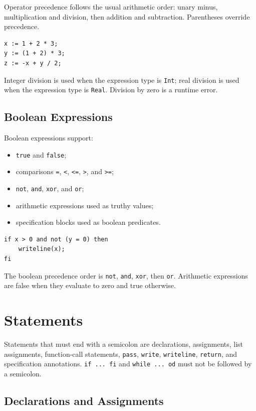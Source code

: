 \documentclass[11pt]{article}
\begin{document}
Operator precedence follows the usual arithmetic order: unary minus, multiplication and division, then addition and subtraction. Parentheses override precedence.

\begin{lstlisting}
x := 1 + 2 * 3;
y := (1 + 2) * 3;
z := -x + y / 2;
\end{lstlisting}

Integer division is used when the expression type is \texttt{Int}; real division is used when the expression type is \texttt{Real}. Division by zero is a runtime error.

\subsection{Boolean Expressions}

Boolean expressions support:

\begin{itemize}[nosep]
  \item \texttt{true} and \texttt{false};
  \item comparisons \texttt{=}, \texttt{<}, \texttt{<=}, \texttt{>}, and \texttt{>=};
  \item \texttt{not}, \texttt{and}, \texttt{xor}, and \texttt{or};
  \item arithmetic expressions used as truthy values;
  \item specification blocks used as boolean predicates.
\end{itemize}

\begin{lstlisting}
if x > 0 and not (y = 0) then
    writeline(x);
fi
\end{lstlisting}

The boolean precedence order is \texttt{not}, \texttt{and}, \texttt{xor}, then \texttt{or}. Arithmetic expressions are false when they evaluate to zero and true otherwise.

\section{Statements}

Statements that must end with a semicolon are declarations, assignments, list assignments, function-call statements, \texttt{pass}, \texttt{write}, \texttt{writeline}, \texttt{return}, and specification annotations. \texttt{if ... fi} and \texttt{while ... od} must not be followed by a semicolon.

\subsection{Declarations and Assignments}
\end{document}
